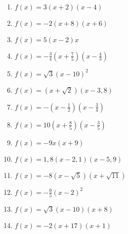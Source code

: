 \begin{Exercise}[title={Bestimme die Nullstellen}, label=produktformNullstellenA1]\\
	\begin{minipage}{\textwidth}
		\begin{minipage}{0.49\textwidth}
			\begin{enumerate}[label=\alph*)]
				\item \(f(x)=3\left(x+2\right)\left(x-4\right)\)
				\item \(f(x)=-2\left(x+8\right)\left(x+6\right)\)
				\item \(f(x)=5\left(x-2\right)x\)
				\item \(f(x)=-\frac{3}{4}\left(x+\frac{7}{5}\right)\left(x-\frac{4}{3}\right)\)
				\item \(f(x)=\sqrt{3}\left(x-10\right)^2\)
				\item \(f(x)=\left(x+\sqrt{2}\right)\left(x-3,8\right)\)
				\item \(f(x)=-\left(x-\frac{1}{2}\right)\left(x-\frac{3}{4}\right)\)
			\end{enumerate}
		\end{minipage}
		\begin{minipage}{0.49\textwidth}
			\begin{enumerate}[label=\alph*)]
				\setcounter{enumi}{7}
				\item \(f(x)=10\left(x+\frac{8}{5}\right)\left(x-\frac{3}{5}\right)\)
				\item \(f(x)=-9x\left(x+9\right)\)
				\item \(f(x)=1,8\left(x-2,1\right)\left(x-5,9\right)\)
				\item \(f(x)=-8\left(x-\sqrt{5}\right)\left(x+\sqrt{11}\right)\)
				\item \(f(x)=-\frac{6}{5}\left(x-2\right)^2\)
				\item \(f(x)=\sqrt{3}\left(x-10\right)\left(x+8\right)\)
				\item \(f(x)=-2\left(x+17\right)\left(x+1\right)\)
			\end{enumerate}
		\end{minipage}
	\end{minipage}
\end{Exercise}

